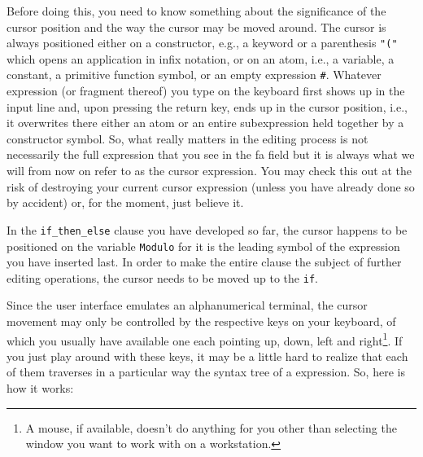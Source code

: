 Before doing this, you need to know something about the significance
of the {\mys cursor position} and the way the cursor may be {\mys moved} around.
The cursor is always positioned either on a \kir constructor, e.g., a
keyword or a parenthesis {\tt "("} which opens an application in infix notation,
 or on an {\mys atom}, i.e., a {\mys variable}, a {\mys constant}, a {\mys primitive function} symbol,
or an empty expression {\tt \#}.
Whatever expression (or fragment thereof) you type on the keyboard first 
shows up in the input line and, upon pressing the return key,
 ends up in the cursor position, i.e.,
it overwrites there either an atom or an entire subexpression held together
by a constructor symbol. So, what really matters in the editing process
is not necessarily the full expression that you see in the 
{\sc fa} field but it is always what we will from now on refer to as the
{\mys cursor expression}. You may check this out at the risk of destroying
your current cursor expression (unless you have already done so by accident)
or, for the moment, just believe it.

In the {\tt if\_then\_else} clause you have developed so far, the cursor
happens to be positioned on the variable {\tt Modulo} for it is the
 leading symbol
of the expression you have inserted last. In order to make the entire clause the subject of further editing operations, the cursor needs to be moved up
to the {\tt if}.

Since the \pired user interface emulates an alphanumerical terminal, the
{\mys cursor movement} may only be controlled by the respective keys on your 
keyboard, of which you usually have available one each pointing {\mys up}, {\mys down},
{\mys left} and {\mys right}\footnote{A mouse, if available, doesn't do anything for you other than selecting
the window you want to work with on a workstation.}. If you just
play around with these keys, it may be a little hard to 
 realize that each of them traverses in  a particular way
the {\mys syntax tree} of a \kir expression.
So, here is how it works:

